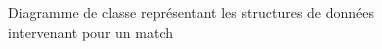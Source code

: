 \documentclass[a4paper]{report}
\begin{document}
\begin{figure}[H]
    \vspace*{-3cm}
    \caption{\label{3} Diagramme de classe représentant les structures de données intervenant pour un match}
\end{figure}
\end{document}
